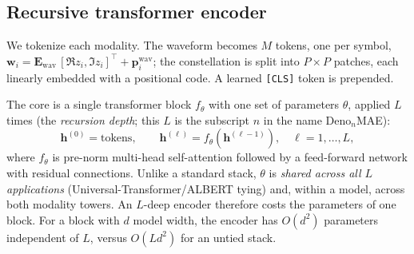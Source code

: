 \documentclass[conference]{IEEEtran}
\begin{document}
\subsection{Recursive transformer encoder}
We tokenize each modality. The waveform becomes $M$ tokens, one per symbol,
$\bm{w}_i = \mathbf{E}_{\text{wav}}\, [\Re z_i, \Im z_i]^\top + \bm{p}^{\text{wav}}_i$;
the constellation is split into $P\times P$ patches, each linearly embedded with a
positional code. A learned \texttt{[CLS]} token is prepended.

The core is a single transformer block $f_\theta$ with one set of parameters
$\theta$, applied $L$ times (the \emph{recursion depth}; this $L$ is the subscript
$n$ in the name Deno$_{n}$MAE):
\begin{equation}
\bm{h}^{(0)} = \text{tokens}, \qquad
\bm{h}^{(\ell)} = f_\theta\!\left(\bm{h}^{(\ell-1)}\right), \quad \ell = 1,\dots,L,
\end{equation}
where $f_\theta$ is pre-norm multi-head self-attention followed by a feed-forward
network with residual connections. Unlike a standard stack, $\theta$ is
\emph{shared across all $L$ applications} (Universal-Transformer/ALBERT tying) and,
within a model, across both modality towers. An $L$-deep encoder therefore costs
the parameters of one block. For a block with $d$ model width, the encoder has
$O(d^2)$ parameters independent of $L$, versus $O(Ld^2)$ for an untied stack.
\end{document}
